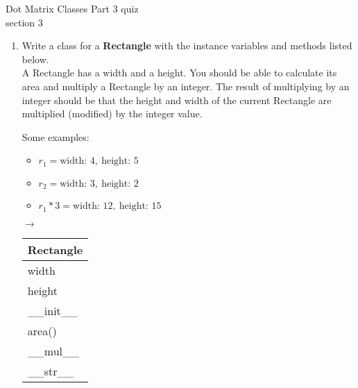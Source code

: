 \documentclass{article}
\begin{document}
\pagebreak
Dot Matrix \hfill Classes Part 3 quiz\\
section 3\\
\begin{enumerate}
	\item
		Write a class for a \textbf{Rectangle} with the instance variables and methods 
		listed below.\\
		A Rectangle has a width and a height. You should be able to calculate its area	and multiply 
		a Rectangle by an integer. The result of multiplying by an integer should be that the height 
		and width of the current Rectangle are multiplied (modified) by the integer value.

		\begin{minipage}[t]{0.7\textwidth}
			Some examples:
			\begin{itemize}
				\item $r_1 = \text{width: } 4,\ \text{height: } 5$
				\item $r_2 = \text{width: } 3,\ \text{height: } 2$
				\item $r_1 * 3 = \text{width: } 12,\ \text{height: } 15$
			\end{itemize}

			\begin{minipage}{0.25\textwidth}
			\end{minipage}
			{\Large $\longrightarrow$} \hspace*{2em}
			\begin{minipage}{0.65\textwidth}
			\end{minipage}
		\end{minipage}
		\hfill
		\begin{minipage}[t]{0.2\textwidth}
			\vspace{.2em}
			\begin{flushright}
				\begin{tabular}{|l|}
					\hline
					Rectangle \\ \hline
					width \\
					height \\ \hline
					\_\_init\_\_ \\
					area() \\
					\_\_mul\_\_ \\
					\_\_str\_\_ \\ \hline
				\end{tabular}
			\end{flushright}
		\end{minipage}
		

\end{enumerate}
\end{document}
